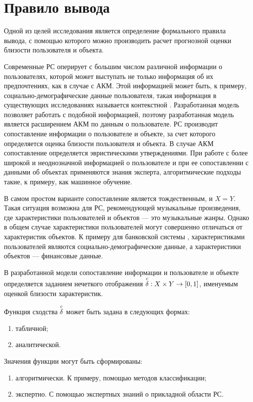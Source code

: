 \section{Правило вывода}
Одной из целей исследования является определение формального правила вывода,
с помощью которого можно производить расчет прогнозной оценки
близости пользователя и объекта.

Современные РС оперирует с большим числом различной информации о
пользователях, которой может выступать не только информация об их
предпочтениях, как в случае с АКМ. Этой информацией может быть, к примеру,
социально-демографические данные пользователя, такая информация в существующих
исследованиях называется контекстной \cite{2d, citation}.
Разработанная модель позволяет работать
с подобной информацией, поэтому разработанная модель является расширением
АКМ по данным о пользователе. РС производит сопоставление
информации о пользователе и объекте, за счет которого определяется
оценка близости пользователя и объекта. В случае АКМ сопоставление
определяется эвристическими утверждениями. При работе с более широкой и
неоднозначной информацией о пользователе и при ее сопоставлении с данными об
объектах применяются знания эксперта, алгоритмические подходы такие, к примеру,
как машинное обучение.

В самом простом варианте сопоставление
является тождественным, и $X = Y$.
Такая ситуация возможна для РС, рекомендующей музыкальные произведения, где
характеристики пользователей и объектов --- это музыкальные жанры. Однако в общем случае
характеристики пользователей могут совершенно отличаться от характеристик
объектов. К примеру для банковской системы \cite{bank},
характеристиками пользователей являются социально-демографические данные,
а характеристики объектов --- финансовые данные.

В разработанной модели сопоставление информации и пользователе и объекте
определяется заданием
нечеткого отображения ${\overset{c}{\mathcal{\delta}}}: X \times Y \rightarrow [0,1]$, именуемым оценкой
близости характеристик.

Функция сходства ${\overset{c}{\mathcal{\delta}}}$ может быть задана в следующих формах:
\begin{enumerate}
\item табличной;
\item аналитической.
\end{enumerate}

Значения функции могут быть сформированы:
\begin{enumerate}
\item алгоритмически. К примеру, помощью методов классификации;
\item экспертно. С помощью экспертных знаний о прикладной области РС.
\end{enumerate}

